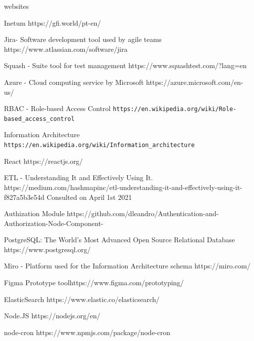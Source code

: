 \documentclass[a4paper,twoside,10pt]{report}
\begin{document}
\begin{thebibliography} {websites}

 Inetum https://gfi.world/pt-en/

 Jira- Software development tool used by agile teams
https://www.atlassian.com/software/jira

 Squash - Suite tool for test management
https://www.squashtest.com/?lang=en

 Azure - Cloud computing service by Microsoft
https://azure.microsoft.com/en-us/

 RBAC - Role-based Access Control
\texttt{https://en.wikipedia.org/wiki/Role-based\_access\_control}

 Information Architecture
\texttt{https://en.wikipedia.org/wiki/Information\_architecture}

 React https://reactjs.org/

 ETL - Understanding It and Effectively Using It.
https://medium.com/hashmapinc/etl-understanding-it-and-effectively-using-it-f827a5b3e54d
Consulted on April 1st 2021

 Authization Module
https://github.com/dleandro/Authentication-and-Authorization-Node-Component-

 PostgreSQL: The World's Most Advanced Open Source Relational Database
https://www.postgresql.org/

 Miro - Platform used for the Information Architecture schema
https://miro.com/

 Figma Prototype toolhttps://www.figma.com/prototyping/

 ElasticSearch  https://www.elastic.co/elasticsearch/

 Node.JS  https://nodejs.org/en/

 node-cron  https://www.npmjs.com/package/node-cron
\end{thebibliography}
\end{document}

